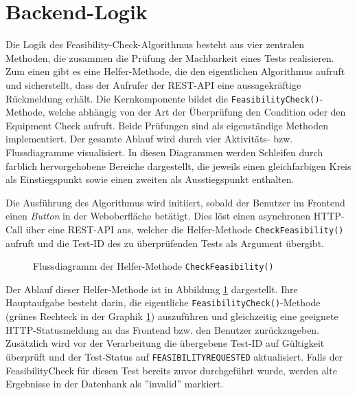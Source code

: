 \section{Backend-Logik}

Die Logik des Feasibility-Check-Algorithmus besteht aus vier zentralen Methoden, die zusammen die Prüfung der Machbarkeit eines Tests realisieren. Zum einen gibt es eine Helfer-Methode, die den eigentlichen Algorithmus aufruft und sicherstellt, dass der Aufrufer der REST-API eine aussagekräftige Rückmeldung erhält. Die Kernkomponente bildet die \texttt{FeasibilityCheck()}-Methode, welche abhängig von der Art der Überprüfung den Condition oder den Equipment Check aufruft. Beide Prüfungen sind als eigenständige Methoden implementiert. Der gesamte Ablauf wird durch vier Aktivitäts- bzw. Flussdiagramme visualisiert. In diesen Diagrammen werden Schleifen durch farblich hervorgehobene Bereiche dargestellt, die jeweils einen gleichfarbigen Kreis als Einstiegspunkt sowie einen zweiten als Ausstiegspunkt enthalten.

Die Ausführung des Algorithmus wird initiiert, sobald der Benutzer im Frontend einen \textit{Button} in der Weboberfläche betätigt. Dies löst einen asynchronen HTTP-Call über eine REST-API aus, welcher die Helfer-Methode \texttt{CheckFeasibility()} aufruft und die Test-ID des zu überprüfenden Tests als Argument übergibt.

\begin{figure}[!htbp]
    \centering
    \caption{Flussdiagramm der Helfer-Methode \texttt{CheckFeasibility()}}
    \label{fig:feasibility-http-call-method}
\end{figure}

Der Ablauf dieser Helfer-Methode ist in Abbildung \ref{fig:feasibility-http-call-method} dargestellt. Ihre Hauptaufgabe besteht darin, die eigentliche \texttt{FeasibilityCheck()}-Methode (grünes Rechteck in der Graphik \ref{fig:feasibility-http-call-method}) auszuführen und gleichzeitig eine geeignete HTTP-Statusmeldung an das Frontend bzw. den Benutzer zurückzugeben. Zusätzlich wird vor der Verarbeitung die übergebene Test-ID auf Gültigkeit überprüft und der Test-Status auf \texttt{FEASIBILITYREQUESTED} aktualisiert. Falls der FeasibilityCheck für diesen Test bereits zuvor durchgeführt wurde, werden alte Ergebnisse in der Datenbank als ''invalid'' markiert.


